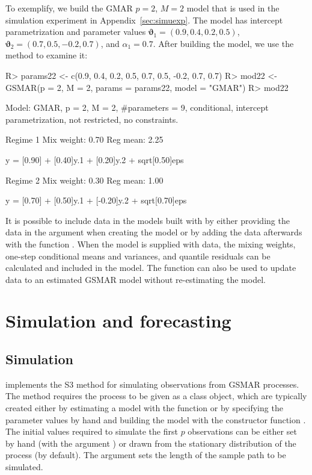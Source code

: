 \documentclass[nojss]{jss} %
\begin{document}
To exemplify, we build the GMAR $p=2$, $M=2$ model that is used in the simulation experiment in Appendix~\ref{sec:simuexp}. The model has intercept parametrization and parameter values $\boldsymbol{\vartheta}_1 = (0.9, 0.4, 0.2, 0.5)$, $\boldsymbol{\vartheta}_2 = (0.7, 0.5, -0.2, 0.7)$, and $\alpha_1 = 0.7$. After building the model, we use the  method to examine it:
%
\begin{CodeChunk}
\begin{CodeInput}
R> params22 <- c(0.9, 0.4, 0.2, 0.5, 0.7, 0.5, -0.2, 0.7, 0.7)
R> mod22 <- GSMAR(p = 2, M = 2, params = params22, model = "GMAR")
R> mod22
\end{CodeInput}
\begin{CodeOutput}
Model:
 GMAR, p = 2, M = 2, #parameters = 9,
 conditional, intercept parametrization, not restricted, no constraints.

Regime 1
Mix weight: 0.70
Reg mean: 2.25

y = [0.90] + [0.40]y.1 + [0.20]y.2 + sqrt[0.50]eps

Regime 2
Mix weight: 0.30
Reg mean: 1.00

y = [0.70] + [0.50]y.1 + [-0.20]y.2 + sqrt[0.70]eps
\end{CodeOutput}
\end{CodeChunk}
%

It is possible to include data in the models built with  by either providing the data in the argument  when creating the model or by adding the data afterwards with the function . When the model is supplied with data, the mixing weights, one-step conditional means and variances, and quantile residuals can be calculated and included in the model. The function  can also be used to update data to an estimated GSMAR model without re-estimating the model.


\section{Simulation and forecasting}\label{sec:simufore}

\subsection{Simulation}\label{sec:simu}

 implements the S3 method  for simulating observations from GSMAR processes. The method requires the process to be given as a class  object, which are typically created either by estimating a model with the function  or by specifying the parameter values by hand and building the model with the constructor function . The initial values required to simulate the first $p$ observations can be either set by hand (with the argument ) or drawn from the stationary distribution of the process (by default). The argument  sets the length of the sample path to be simulated.
\end{document}

